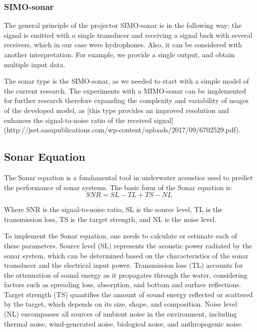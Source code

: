 \subsubsection{SIMO-sonar}

The general principle of the projector SIMO-sonar is in the following way:  the signal is emitted with a single transducer and receiving a signal back with several receivers, which in our case were hydrophones. Also, it can be considered with another interpretation. For example, we provide a single output, and obtain multiple input data.
    
The sonar type is the SIMO-sonar, as we needed to start with a simple model of the current research. The experiments with a MIMO-sonar can be implemented for further research therefore expanding the complexity and variability of usages of the developed model, as [this type provides an improved resolution and enhances the signal-to-noise ratio of the received signal] (http://jset.sasapublications.com/wp-content/uploads/2017/09/6702529.pdf).
    
	
\subsection{Sonar Equation }
The Sonar equation is a fundamental tool in underwater acoustics used to predict the performance of sonar systems. 
The basic form of the Sonar equation is:
\begin{equation}
    SNR=SL-TL+TS-NL
\end{equation}

Where
SNR is the signal-to-noise ratio,
SL is the source level,
TL is the transmission loss,
TS is the target strength, and
NL is the noise level.

To implement the Sonar equation, one needs to calculate or estimate each of these parameters. 
Source level (SL) represents the acoustic power radiated by the sonar system, which can be determined based on the characteristics of the sonar transducer and the electrical input power. 
Transmission loss (TL) accounts for the attenuation of sound energy as it propagates through the water, considering factors such as spreading loss, absorption, and bottom and surface reflections. 
Target strength (TS) quantifies the amount of sound energy reflected or scattered by the target, which depends on its size, shape, and composition. 
Noise level (NL) encompasses all sources of ambient noise in the environment, including thermal noise, wind-generated noise, biological noise, and anthropogenic noise.



